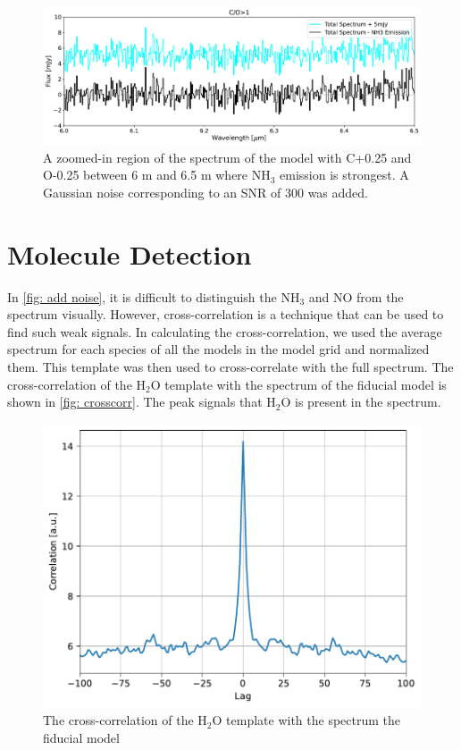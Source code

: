 \documentclass[oneside, single, authoryear, semicolon, 12pt]{lion-msc}
\newcommand{\4}{$_4$}
\newcommand{\3}{$_3$}
\newcommand{\2}{$_2$}
\begin{document}
\begin{figure}[H]
    \centering
    \includegraphics[width=\linewidth]{Figures/AddNoise.pdf}
    \caption{A zoomed-in region of the spectrum of the model with C+0.25 and O-0.25 between 6 \textmu m and 6.5 \textmu m where NH\3 emission is strongest. A Gaussian noise corresponding to an SNR of 300 was added.}
    \label{fig: add noise}
\end{figure}

\section{Molecule Detection}
In \autoref{fig: add noise}, it is difficult to distinguish the NH\3 and NO from the spectrum visually. However, cross-correlation is a technique that can be used to find such weak signals. In calculating the cross-correlation, we used the average spectrum for each species of all the models in the model grid and normalized them. This template was then used to cross-correlate with the full spectrum. The cross-correlation of the H\2O template with the spectrum of the fiducial model is shown in \autoref{fig: crosscorr}. The peak signals that H\2O is present in the spectrum. 

\begin{figure}[H]
    \centering
    \includegraphics[width=.6\linewidth]{Figures/Cross-Correlation.pdf}
    \caption{The cross-correlation of the H\2O template with the spectrum the fiducial model}
    \label{fig: crosscorr}
\end{figure}
\end{document}
